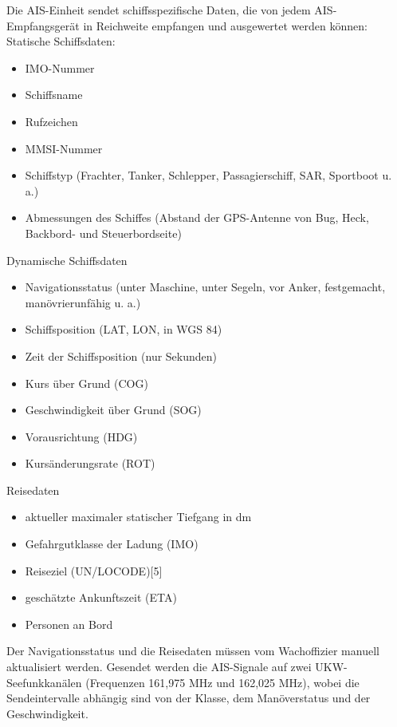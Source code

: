 Die AIS-Einheit sendet schiffsspezifische Daten, die von jedem AIS-Empfangsgerät in Reichweite empfangen und ausgewertet werden können:
Statische Schiffsdaten: 
\begin{itemize}
\item IMO-Nummer
\item Schiffsname
\item Rufzeichen
\item MMSI-Nummer
\item Schiffstyp (Frachter, Tanker, Schlepper, Passagierschiff, SAR, Sportboot u. a.)
\item Abmessungen des Schiffes (Abstand der GPS-Antenne von Bug, Heck, Backbord- und Steuerbordseite)
\end{itemize}

Dynamische Schiffsdaten
\begin{itemize}
\item Navigationsstatus (unter Maschine, unter Segeln, vor Anker, festgemacht, manövrierunfähig u. a.)
\item Schiffsposition (LAT, LON, in WGS 84)
\item Zeit der Schiffsposition (nur Sekunden)
\item Kurs über Grund (COG)
\item Geschwindigkeit über Grund (SOG)
\item Vorausrichtung (HDG)
\item Kursänderungsrate (ROT)
\end{itemize}

Reisedaten
\begin{itemize}
\item aktueller maximaler statischer Tiefgang in dm
\item Gefahrgutklasse der Ladung (IMO)
\item Reiseziel (UN/LOCODE)[5]
\item geschätzte Ankunftszeit (ETA)
\item Personen an Bord
\end{itemize}

Der Navigationsstatus und die Reisedaten müssen vom Wachoffizier manuell aktualisiert werden. Gesendet werden die AIS-Signale auf zwei UKW-Seefunkkanälen (Frequenzen 161,975 MHz und 162,025 MHz), wobei die Sendeintervalle abhängig sind von der Klasse, dem Manöverstatus und der Geschwindigkeit.


